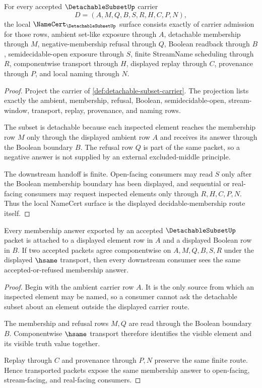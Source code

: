 \begin{theorem}
\label{thm:detachable-subset-namecert-obligations}
For every accepted $\DetachableSubsetUp$ carrier
$$
D=(A,M,Q,B,S,R,H,C,P,N),
$$
the local $\NameCert_{\DetachableSubsetUp}$ surface consists exactly of carrier admission for those rows, ambient set-like exposure through $A$, detachable membership through $M$, negative-membership refusal through $Q$, Boolean readback through $B$, semidecidable-open exposure through $S$, finite StreamName scheduling through $R$, componentwise transport through $H$, displayed replay through $C$, provenance through $P$, and local naming through $N$.
\end{theorem}
\begin{proof}
Project the carrier of \autoref{def:detachable-subset-carrier}. The projection lists exactly the ambient, membership, refusal, Boolean, semidecidable-open, stream-window, transport, replay, provenance, and naming rows.

The subset is detachable because each inspected element reaches the membership row $M$ only through the displayed ambient row $A$ and receives its answer through the Boolean boundary $B$. The refusal row $Q$ is part of the same packet, so a negative answer is not supplied by an external excluded-middle principle.

The downstream handoff is finite. Open-facing consumers may read $S$ only after the Boolean membership boundary has been displayed, and sequential or real-facing consumers may request inspected elements only through $R,H,C,P,N$. Thus the local NameCert surface is the displayed decidable-membership route itself.
\end{proof}

\begin{theorem}
\label{thm:detachable-subset-finite-membership-route}
Every membership answer exported by an accepted $\DetachableSubsetUp$ packet is attached to a displayed element row in $A$ and a displayed Boolean row in $B$. If two accepted packets agree componentwise on $A,M,Q,B,S,R$ under the displayed $\hsame$ transport, then every downstream consumer sees the same accepted-or-refused membership answer.
\end{theorem}
\begin{proof}
Begin with the ambient carrier row $A$. It is the only source from which an inspected element may be named, so a consumer cannot ask the detachable subset about an element outside the displayed carrier route.

The membership and refusal rows $M,Q$ are read through the Boolean boundary $B$. Componentwise $\hsame$ transport therefore identifies the visible element and its visible truth value together.

Replay through $C$ and provenance through $P,N$ preserve the same finite route. Hence transported packets expose the same membership answer to open-facing, stream-facing, and real-facing consumers.
\end{proof}

